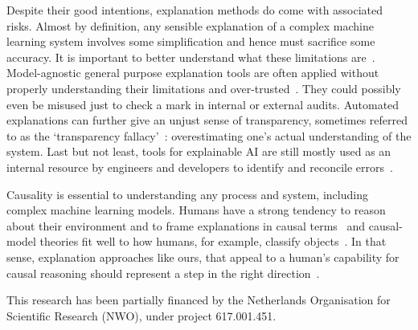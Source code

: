 \documentclass{article}
\begin{document}
Despite their good intentions, explanation methods do come with associated risks. Almost by definition, any sensible explanation of a complex machine learning system involves some simplification and hence must sacrifice some accuracy. It is important to better understand what these limitations are~\cite{kumar2020problems}. Model-agnostic general purpose explanation tools are often applied without properly understanding their limitations and over-trusted~\cite{kaur2020interpreting}. They could possibly even be misused just to check a mark in internal or external audits. Automated explanations can further give an unjust sense of transparency, sometimes referred to as the `transparency fallacy'~\cite{edwards2017slave}: overestimating one's actual understanding of the system. Last but not least, tools for explainable AI are still mostly used as an internal resource by engineers and developers to identify and reconcile errors~\cite{bhatt2020explainable}.

Causality is essential to understanding any process and system, including complex machine learning models. Humans have a strong tendency to reason about their environment and to frame explanations in causal terms~\cite{sloman2005causal,lombrozo2017causal} and causal-model theories fit well to how humans, for example, classify objects~\cite{rehder2003causal}. In that sense, explanation approaches like ours, that appeal to a human's capability for causal reasoning should represent a step in the right direction~\cite{mittelstadt2019explaining}.

\begin{ack}
This research has been partially financed by the Netherlands Organisation for Scientific Research (NWO), under project 617.001.451. 
\end{ack}



\end{document}
